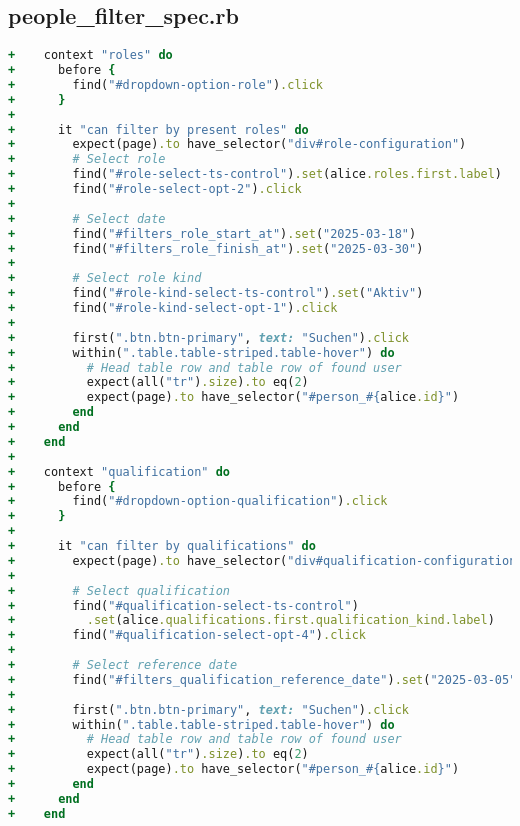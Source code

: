 \subsection{people\_filter\_spec.rb}
\begin{lstlisting}[language=Ruby]
+    context "roles" do
+      before {
+        find("#dropdown-option-role").click
+      }
+
+      it "can filter by present roles" do
+        expect(page).to have_selector("div#role-configuration")
+        # Select role
+        find("#role-select-ts-control").set(alice.roles.first.label)
+        find("#role-select-opt-2").click
+
+        # Select date
+        find("#filters_role_start_at").set("2025-03-18")
+        find("#filters_role_finish_at").set("2025-03-30")
+
+        # Select role kind
+        find("#role-kind-select-ts-control").set("Aktiv")
+        find("#role-kind-select-opt-1").click
+
+        first(".btn.btn-primary", text: "Suchen").click
+        within(".table.table-striped.table-hover") do
+          # Head table row and table row of found user
+          expect(all("tr").size).to eq(2)
+          expect(page).to have_selector("#person_#{alice.id}")
+        end
+      end
+    end
+
+    context "qualification" do
+      before {
+        find("#dropdown-option-qualification").click
+      }
+
+      it "can filter by qualifications" do
+        expect(page).to have_selector("div#qualification-configuration")
+
+        # Select qualification
+        find("#qualification-select-ts-control")
+          .set(alice.qualifications.first.qualification_kind.label)
+        find("#qualification-select-opt-4").click
+
+        # Select reference date
+        find("#filters_qualification_reference_date").set("2025-03-05")
+
+        first(".btn.btn-primary", text: "Suchen").click
+        within(".table.table-striped.table-hover") do
+          # Head table row and table row of found user
+          expect(all("tr").size).to eq(2)
+          expect(page).to have_selector("#person_#{alice.id}")
+        end
+      end
+    end
\end{lstlisting}

\newpage

